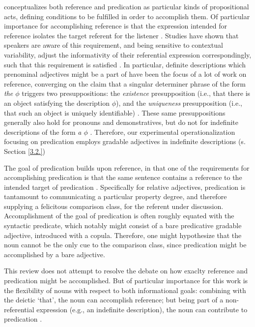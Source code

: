 \textcite{searle1969speech} conceptualizes both reference and predication as particular kinds of propositional acts, defining conditions to be fulfilled in order to accomplish them. Of particular importance for accomplishing reference is that the expression intended for reference isolates the target referent for the listener \parencite{searle1969speech}. Studies have shown that speakers are aware of this requirement, and being sensitive to contextual variability, adjust the informativity of their referential expression correspondingly, such that this requirement is satisfied \parencite[e.g.,][]{graf2016animal}. In particular, definite descriptions which prenominal adjectives might be a part of have been the focus of a lot of work on reference, converging on the claim that a singular determiner phrase of the form \emph{the $\phi$} triggers two presuppositions: the \textit{existence} presupposition (i.e., that there is an object satisfying the description $\phi$), and the \textit{uniqueness} presupposition (i.e., that such an object is uniquely identifiable) \parencite{syrett2010meaning, michaelson2019}. These same presuppositions generally also hold for pronouns and demonstratives, but do not for indefinite descriptions of the form \textit{a $\phi$} \parencite{braun2017, Reboul2001}. Therefore, our experimental operationalization focusing on predication employs gradable adjectives in indefinite descriptions (s. Section \ref{3.2.})

The goal of predication builds upon reference, in that one of the requirements for accomplishing predication is that the same sentence contains a reference to the intended target of predication \parencite{searle1969speech, Reboul2001}. Specifically for relative adjectives, predication is tantamount to communicating a particular property degree, and therefore supplying a felicitous comparison class, for the referent under discussion. Accomplishment of the goal of predication is often roughly equated with the syntactic predicate, which notably might consist of a bare predicative gradable adjective, introduced with a copula. Therefore, one might hypothesize that the noun cannot be the only cue to the comparison class, since predication might be accomplished by a bare adjective.

This review does not attempt to resolve the debate on how exaclty reference and predication might be accomplished. But of particular importance for this work is the flexibility of nouns with respect to both informational goals: combining with the deictic ‘that’, the noun can accomplish reference; but being part of a non-referential expression (e.g., an indefinite description), the noun can contribute to predication \parencite{Reboul2001}. 

